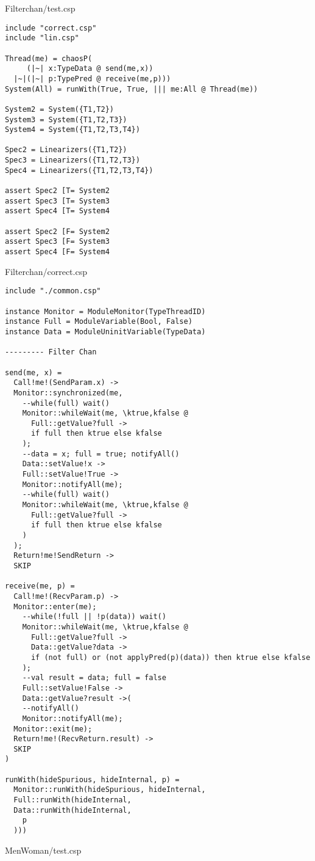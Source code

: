 Filterchan/test.csp
\begin{lstlisting}
include "correct.csp"
include "lin.csp"

Thread(me) = chaosP(
     (|~| x:TypeData @ send(me,x))
  |~|(|~| p:TypePred @ receive(me,p)))
System(All) = runWith(True, True, ||| me:All @ Thread(me))

System2 = System({T1,T2})
System3 = System({T1,T2,T3})
System4 = System({T1,T2,T3,T4})

Spec2 = Linearizers({T1,T2})
Spec3 = Linearizers({T1,T2,T3})
Spec4 = Linearizers({T1,T2,T3,T4})

assert Spec2 [T= System2
assert Spec3 [T= System3
assert Spec4 [T= System4

assert Spec2 [F= System2
assert Spec3 [F= System3
assert Spec4 [F= System4
\end{lstlisting}
Filterchan/correct.csp
\begin{lstlisting}
include "./common.csp"

instance Monitor = ModuleMonitor(TypeThreadID)
instance Full = ModuleVariable(Bool, False)
instance Data = ModuleUninitVariable(TypeData)

--------- Filter Chan

send(me, x) = 
  Call!me!(SendParam.x) ->
  Monitor::synchronized(me,
    --while(full) wait()
    Monitor::whileWait(me, \ktrue,kfalse @
      Full::getValue?full ->
      if full then ktrue else kfalse
    );
    --data = x; full = true; notifyAll()
    Data::setValue!x ->
    Full::setValue!True ->
    Monitor::notifyAll(me);
    --while(full) wait()
    Monitor::whileWait(me, \ktrue,kfalse @
      Full::getValue?full ->
      if full then ktrue else kfalse
    )
  );
  Return!me!SendReturn ->
  SKIP

receive(me, p) = 
  Call!me!(RecvParam.p) ->
  Monitor::enter(me);
    --while(!full || !p(data)) wait()
    Monitor::whileWait(me, \ktrue,kfalse @
      Full::getValue?full ->
      Data::getValue?data ->
      if (not full) or (not applyPred(p)(data)) then ktrue else kfalse
    );
    --val result = data; full = false
    Full::setValue!False ->
    Data::getValue?result ->(
    --notifyAll()
    Monitor::notifyAll(me);
  Monitor::exit(me);
  Return!me!(RecvReturn.result) ->
  SKIP
)

runWith(hideSpurious, hideInternal, p) =
  Monitor::runWith(hideSpurious, hideInternal,
  Full::runWith(hideInternal,
  Data::runWith(hideInternal,
    p
  )))
\end{lstlisting}
MenWoman/test.csp
